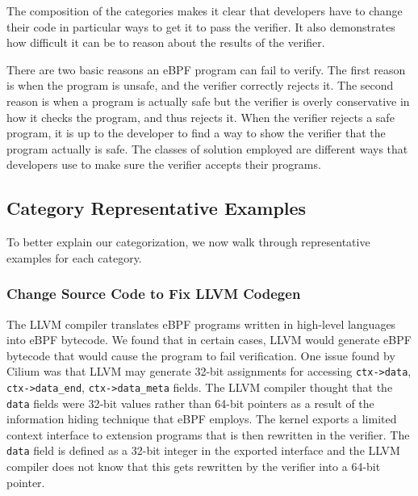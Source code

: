 
The composition of the categories makes it clear that developers have to change their code in particular ways to get it to pass the verifier.
It also demonstrates how difficult it can be to reason about the results of the verifier.

There are two basic reasons an eBPF program can fail to verify. %
The first reason is when the program is unsafe, and the verifier correctly rejects it.
The second reason is when a program is actually safe but the verifier is overly conservative
in how it checks the program, and thus rejects it.
When the verifier rejects a safe program, it is up to the developer to find a way to show the verifier that the program actually is safe.
The classes of solution employed are different ways that developers use to make sure the verifier accepts their programs.

\subsection{Category Representative Examples}
To better explain our categorization, we now walk through representative examples for each category.

\subsubsection{Change Source Code to Fix LLVM Codegen}
\label{motivation:llvm-codegen}
The LLVM compiler translates eBPF programs written in high-level languages into eBPF bytecode.
We found that in certain cases, LLVM would generate eBPF bytecode that would cause the program to fail verification.
One issue found by Cilium was that LLVM may generate 32-bit assignments for
    accessing \texttt{ctx->data}, \texttt{ctx->data\_end}, \texttt{ctx->data\_meta} fields.
The LLVM compiler thought that the \texttt{data} fields were 32-bit values rather than 64-bit pointers as 
    a result of the information hiding technique that
    eBPF employs.
The kernel exports a limited context interface to extension programs that is then rewritten in the verifier.
The \texttt{data} field is defined as a 32-bit integer in the exported interface and
    the LLVM compiler does not know that this gets rewritten by the verifier into a 64-bit pointer.

